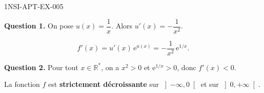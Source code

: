 \begin{corrige}{1NSI-APT-EX-005}

\textbf{Question 1.} On pose $u(x) = \dfrac{1}{x}$. Alors $u'(x) = -\dfrac{1}{x^2}$.

\[ f'(x) = u'(x)\,\mathrm{e}^{u(x)} = -\frac{1}{x^2}\,\mathrm{e}^{1/x}. \]


\textbf{Question 2.} Pour tout $x \in \mathbb{R}^*$, on a $x^2 > 0$ et $\mathrm{e}^{1/x} > 0$, donc $f'(x) < 0$.

La fonction $f$ est \textbf{strictement décroissante} sur $\left]-\infty, 0\right[$ et sur $\left]0, +\infty\right[$.

\end{corrige}
